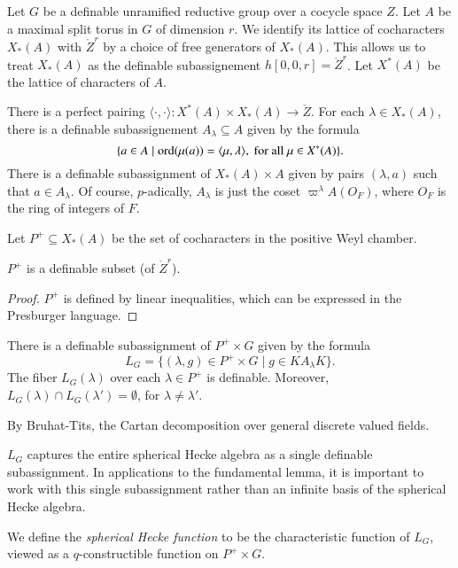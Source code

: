 Let $G$ be a definable unramified reductive group over a cocycle space
$Z$.  Let $A$ be a maximal split torus in $G$ of dimension $r$.  We
identify its lattice of cocharacters $X_*(A)$ with $\ring{Z}^r$ by a
choice of free generators of $X_*(A)$.  This allows us to treat
$X_*(A)$ as the definable subassignement $h[0,0,r] = \ring{Z}^r$.  Let
$X^*(A)$ be the lattice of characters of $A$.

There is a perfect pairing $\langle\cdot,\cdot\rangle:X^*(A)\times
X_*(A) \to \ring{Z}$.  For each $\lambda\in X_*(A)$, there is a
definable subassignement $A_\lambda \subseteq A$ given by the formula
\[
\{ a \in A \mid {\operatorname{ord}}(\mu(a)) 
= \langle{\mu,\lambda}\rangle,\text{ for all } \mu\in X^*(A) \}.
\]
There is a definable subassignment of $X_*(A)\times A$ given by pairs
$(\lambda,a)$ such that $a\in A_\lambda$.  Of course, $p$-adically,
$A_\lambda$ is just the coset $\varpi^\lambda A(O_F)$, where $O_F$ is
the ring of integers of $F$.

Let $P^+\subseteq X_*(A)$ be the set of cocharacters in the positive
Weyl chamber.

\begin{lemma} 
  $P^+$ is a definable subset (of $\ring{Z}^r$).
\end{lemma}

\begin{proof} 
  $P^+$ is defined by linear inequalities, which can be expressed in
  the Presburger language.
\end{proof}

\begin{lemma} \label{lemma:cartan}
  There is a definable subassignment of $P^+\times G$ given by the
  formula
\[
L_G = \{(\lambda,g)\in P^+\times G \mid g \in K A_\lambda K \}.
\]
The fiber $L_G(\lambda)$ over each $\lambda\in P^+$ is definable.
Moreover, $L_G(\lambda)\cap L_G(\lambda') = \emptyset$, for
$\lambda\ne \lambda'$.
\end{lemma}

By Bruhat-Tits, the Cartan decomposition over general discrete valued
fields.

\begin{remark}   
  $L_G$ captures the entire spherical Hecke algebra as a single
  definable subassignment.  In applications to the fundamental lemma,
  it is important to work with this single subassignment rather than
  an infinite basis of the spherical Hecke algebra.
\end{remark}

We define the {\it spherical Hecke function} to be the characteristic
function of $L_G$, viewed as a $q$-constructible function on
$P^+\times G$.

